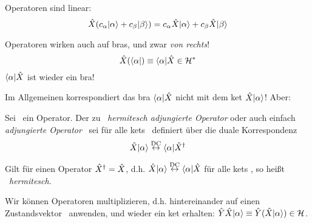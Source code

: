 \begin{eig}
 Operatoren sind linear:
 \begin{equation}
  \opx(\ca \keta + \cb \ketb) = \ca \opx \keta + \cb \opx \ketb
 \end{equation}
\end{eig}

\begin{eig}
Operatoren wirken auch auf bras, und zwar \emph{von rechts}!
\begin{equation}
\opx(\braa) \equiv \braa \opx \in \ds
\end{equation} 
$\braa\opx$ ist wieder ein bra!
\end{eig}

\begin{notiz}
 Im Allgemeinen korrespondiert das bra $\braa \opx$ nicht mit dem ket $\opx \keta$! Aber:
\end{notiz}

\begin{defn}
 Sei \opx\ ein Operator. Der zu \opx\ \emph{hermitesch adjungierte Operator} oder auch einfach \emph{adjungierte Operator} \opxh\ sei f\"ur alle kets \keta\ definiert \"uber die duale Korrespondenz
 \begin{equation}
  \opx \keta \dc \braa \opxh
 \end{equation}

\end{defn}

\begin{defn}
 Gilt f\"ur einen Operator ${\hat{X}}^{\dag} = \hat{X}$, d.h. $\opx \keta \dc \braa \opx$ f\"ur alle kets \keta, so hei\ss{}t \opx\ \emph{hermitesch}.
\end{defn}

\begin{eig}
 Wir k\"onnen Operatoren multiplizieren, d.h. hintereinander auf einen Zustandsvektor \keta\ anwenden, und wieder ein ket erhalten: $\opy \opx \keta \equiv \opy ( \opx \keta) \in \hs$.
\end{eig}
